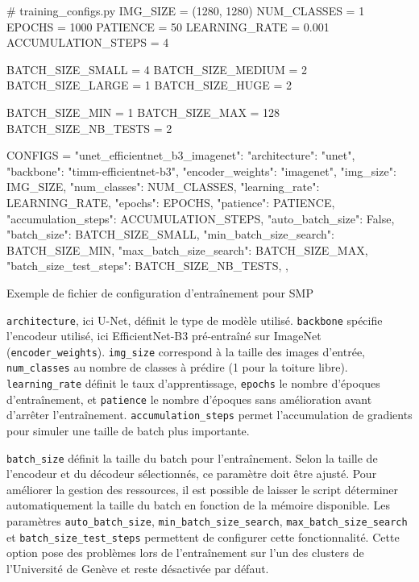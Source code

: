 \begin{code}[H]
    \begin{pythoncode}
    # training_configs.py
    IMG_SIZE = (1280, 1280)
    NUM_CLASSES = 1
    EPOCHS = 1000
    PATIENCE = 50
    LEARNING_RATE = 0.001
    ACCUMULATION_STEPS = 4

    BATCH_SIZE_SMALL = 4
    BATCH_SIZE_MEDIUM = 2
    BATCH_SIZE_LARGE = 1
    BATCH_SIZE_HUGE = 2

    BATCH_SIZE_MIN = 1
    BATCH_SIZE_MAX = 128
    BATCH_SIZE_NB_TESTS = 2

    CONFIGS = {
        "unet_efficientnet_b3_imagenet": {
            "architecture": "unet",
            "backbone": "timm-efficientnet-b3",
            "encoder_weights": "imagenet",
            "img_size": IMG_SIZE,
            "num_classes": NUM_CLASSES,
            "learning_rate": LEARNING_RATE,
            "epochs": EPOCHS,
            "patience": PATIENCE,
            "accumulation_steps": ACCUMULATION_STEPS,
            "auto_batch_size": False,
            "batch_size": BATCH_SIZE_SMALL,
            "min_batch_size_search": BATCH_SIZE_MIN,
            "max_batch_size_search": BATCH_SIZE_MAX,
            "batch_size_test_steps": BATCH_SIZE_NB_TESTS,
        },
    }
    \end{pythoncode}
    \caption{Exemple de fichier de configuration d'entraînement pour SMP}
    \label{code:ch36_entrainement_config_smp}
\end{code}

\texttt{architecture}, ici U-Net, définit le type de modèle utilisé. \texttt{backbone} spécifie l'encodeur utilisé, ici EfficientNet-B3 pré-entraîné sur ImageNet (\texttt{encoder\_weights}). \texttt{img\_size} correspond à la taille des images d'entrée, \texttt{num\_classes} au nombre de classes à prédire (1 pour la toiture libre). \texttt{learning\_rate} définit le taux d'apprentissage, \texttt{epochs} le nombre d'époques d'entraînement, et \texttt{patience} le nombre d'époques sans amélioration avant d'arrêter l'entraînement. \texttt{accumulation\_steps} permet l'accumulation de gradients pour simuler une taille de batch plus importante.

\texttt{batch\_size} définit la taille du batch pour l'entraînement. Selon la taille de l'encodeur et du décodeur sélectionnés, ce paramètre doit être ajusté. Pour améliorer la gestion des ressources, il est possible de laisser le script déterminer automatiquement la taille du batch en fonction de la mémoire disponible. Les paramètres \texttt{auto\_batch\_size}, \texttt{min\_batch\_size\_search}, \texttt{max\_batch\_size\_search} et \texttt{batch\_size\_test\_steps} permettent de configurer cette fonctionnalité. Cette option pose des problèmes lors de l'entraînement sur l'un des clusters de l'Université de Genève et reste désactivée par défaut.

